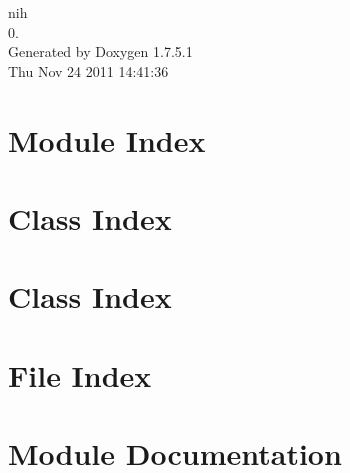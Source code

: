 \documentclass[a4paper]{book}
\begin{document}
\hypersetup{pageanchor=false,citecolor=blue}
\begin{titlepage}
\vspace*{7cm}
\begin{center}
{\Large nih \\[1ex]\large 0. }\\
\vspace*{1cm}
{\large \-Generated by Doxygen 1.7.5.1}\\
\vspace*{0.5cm}
{\small Thu Nov 24 2011 14:41:36}\\
\end{center}
\end{titlepage}
\clearemptydoublepage
{}
\tableofcontents
\clearemptydoublepage
{}
\hypersetup{pageanchor=true,citecolor=blue}
\chapter{\-Module \-Index}

\chapter{\-Class \-Index}

\chapter{\-Class \-Index}

\chapter{\-File \-Index}

\chapter{\-Module \-Documentation}





















\end{document}
